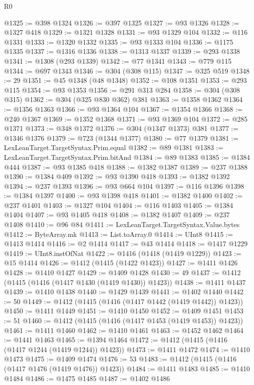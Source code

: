\begin{lexlean}{R0}
\begin{coremodule}
@1325 := @398 @1324
@1326 := @397 @1325
@1327 := @93 @1326
@1328 := @1327 @418
@1329 := @1321 @1328
@1331 := @93 @1329 @104
@1332 := @116 @1331
@1333 := @1320 @1332
@1335 := @93 @1333 @104
@1336 := @1175 @1335
@1337 := @1316 @1336
@1338 := @1313 @1337
@1339 := @293 @1338
@1341 := @1308 (@293 @1339)
@1342 := @77 @1341
@1343 := @779 @115
@1344 := @697 @1343
@1346 := @304 (@308 @115)
@1347 := @325 @519
@1348 := 29
@1351 := @45 @1348 (@48 @1348)
@1352 := @108 @1351
@1353 := @293 @115
@1354 := @93 @1353
@1356 := @291 @313 @284
@1358 := @304 (@308 @315)
@1362 := @304 (@325 @830 @362) @381
@1363 := @1358 @1362
@1364 := @1356 @1363
@1366 := @93 @1364 @104
@1367 := @1354 @1366
@1368 := @240 @1367
@1369 := @1352 @1368
@1371 := @93 @1369 @104
@1372 := @285 @1371
@1373 := @348 @1372
@1376 := @304 (@1347 @1373) @381
@1377 := @1346 @1376
@1379 := @723 (@1344 @1377)
@1380 := @77 @1379
@1381 := LexLeanTarget.TargetSyntax.Prim.equal
@1382 := @89 @1381
@1383 := LexLeanTarget.TargetSyntax.Prim.bitAnd
@1384 := @89 @1383
@1385 := @1384 @444
@1387 := @93 @1385 @418
@1388 := @1382 @1387
@1389 := @237 @1388
@1390 := @1384 @409
@1392 := @93 @1390 @418
@1393 := @1382 @1392
@1394 := @237 @1393
@1396 := @93 @664 @104
@1397 := @116 @1396
@1398 := @1384 @1397
@1400 := @93 @1398 @418
@1401 := @1382 @1400
@1402 := @237 @1401
@1403 := @1327 @104
@1404 := @116 @1403
@1405 := @1384 @1404
@1407 := @93 @1405 @418
@1408 := @1382 @1407
@1409 := @237 @1408
@1410 := @96 @84
@1411 := LexLeanTarget.TargetSyntax.Value.bytes
@1412 := ByteArray.mk
@1413 := List.toArray.{0}
@1414 := UInt8
@1415 := @1413 @1414
@1416 := @2 @1414
@1417 := @43 @1414
@1418 := @1417 @1229
@1419 := UInt8.instOfNat
@1422 := @1416 (@1418 (@1419 @1229))
@1423 := @15 @1414
@1426 := @1412 (@1415 (@1422 @1423))
@1427 := @1411 @1426
@1428 := @1410 @1427
@1429 := @1409 @1428
@1430 := 49
@1437 := @1412 (@1415 (@1416 (@1417 @1430 (@1419 @1430)) @1423))
@1438 := @1411 @1437
@1439 := @1410 @1438
@1440 := @1429 @1439
@1441 := @1402 @1440
@1442 := 50
@1449 := @1412 (@1415 (@1416 (@1417 @1442 (@1419 @1442)) @1423))
@1450 := @1411 @1449
@1451 := @1410 @1450
@1452 := @1409 @1451
@1453 := 51
@1460 := @1412 (@1415 (@1416 (@1417 @1453 (@1419 @1453)) @1423))
@1461 := @1411 @1460
@1462 := @1410 @1461
@1463 := @1452 @1462
@1464 := @1441 @1463
@1465 := @1394 @1464
@1472 := @1412 (@1415 (@1416 (@1417 @1244 (@1419 @1244)) @1423))
@1473 := @1411 @1472
@1474 := @1410 @1473
@1475 := @1409 @1474
@1476 := 53
@1483 := @1412 (@1415 (@1416 (@1417 @1476 (@1419 @1476)) @1423))
@1484 := @1411 @1483
@1485 := @1410 @1484
@1486 := @1475 @1485
@1487 := @1402 @1486

\end{coremodule}
\end{lexlean}
